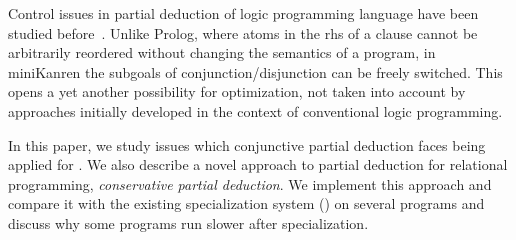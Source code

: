 Control issues in partial deduction of logic programming language \pro have been studied before~\cite{leuschel2002logic}.
Unlike Prolog, where atoms in the rhs of a clause cannot be arbitrarily reordered without changing the semantics of a program, in miniKanren the subgoals of conjunction/disjunction can be freely switched.
This opens a yet another possibility for optimization, not taken into account by approaches initially developed in the context of conventional logic programming.

In this paper, we study issues which conjunctive partial deduction faces being applied for \mk.
We also describe a novel approach to partial deduction for relational programming, \emph{conservative partial deduction}.
We implement this approach and compare it with the existing specialization system (\ecce) on several programs and discuss why some \mk programs run slower after specialization.
